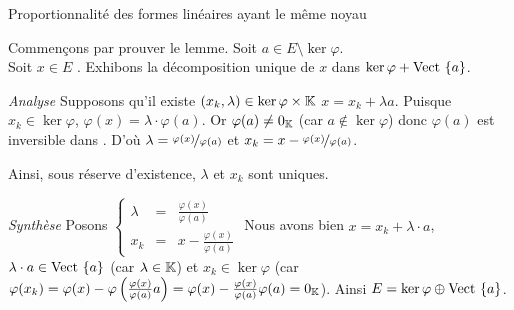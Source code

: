 \documentclass{article}
\begin{document}
	\begin{question_kholle}
		[\textit{Lemme fondamental dans l'étude des formes linéaires} \ \
		Soit $\varphi \in E^* \setminus \{0_{E^*}\}$. \\
		Tout vecteur de $E$ n'appartenant pas au noyau de $\varphi$ engendre une droite qui est supplémentaire au noyau de $\varphi$ dans $E$.
		\begin{equation}
			\forall a \in E \setminus \ker \varphi, \
			E = \ker \varphi \oplus \Vect{\{a\}}
		\end{equation}
		
		Deux formes linéaires non nulles $\varphi$ et $\psi$ ont le même noyau si est seulement si elles sont proportionnelles ce qui revient à dire que la famille $\left(\varphi,\psi\right)$ est liée.
		\begin{equation}
			\forall \left(\varphi,\psi\right) \in \left( E^* \setminus \{0_{E^*}\} \right) \!^2, \
			\ker \varphi = \ker \psi \iff \exists \lambda \in \K^* : \varphi = \lambda \cdot \psi
		\end{equation}]
		{Proportionnalité des formes linéaires ayant le même noyau}
		
		Commençons par prouver le lemme.
		Soit $a \in E \setminus \ker \varphi$. \\
		Soit $x \in E$ \fq.
		Exhibons la décomposition unique de $x$ dans $\ker \varphi + \text{Vect }{\{a\}}$.
		
		\textit{Analyse} Supposons qu'il existe $(x_k, \lambda) \in \ker \varphi \times \mathbb K$ \tq $x = x_k + \lambda a$.
		Puisque $x_k \in \ker \varphi$, $\varphi(x) = \lambda \cdot \varphi(a)$. Or $\varphi(a) \neq 0_{\mathbb K}$ (car $a \notin \ker \varphi$) donc $\varphi(a)$ est inversible dans \K.
		D'où $\lambda = \nicefrac{\varphi(x)}{\varphi(a)}$ et $x_k = x - \nicefrac{\varphi(x)}{\varphi(a)}$.
		
		Ainsi, sous réserve d'existence, $\lambda$ et $x_k$ sont uniques.
		
		\textit{Synthèse} Posons $\displaystyle \left\{ \begin{matrix}
			\lambda &=& \frac{\varphi(x)}{\varphi(a)} \\
			x_k &=& x - \frac{\varphi(x)}{\varphi(a)}
		\end{matrix} \right.$
		Nous avons bien
		$x = x_k + \lambda \cdot a$,
		$\lambda \cdot a \in \text{Vect }{\{a\}}$ (car $\lambda \in \mathbb K$)
		et $x_k \in \ker \varphi$ (car $\varphi(x_k) = \varphi(x) - \varphi\left( \frac{\varphi(x)}{\varphi(a)} a \right) = \varphi(x) - \frac{\varphi(x)}{\varphi(a)} \varphi(a) = 0_{\mathbb K}$).
		Ainsi $E = \ker \varphi \oplus \text{Vect }{\{a\}}$.
		\newline \newline
		

\end{question_kholle}
\end{document}
